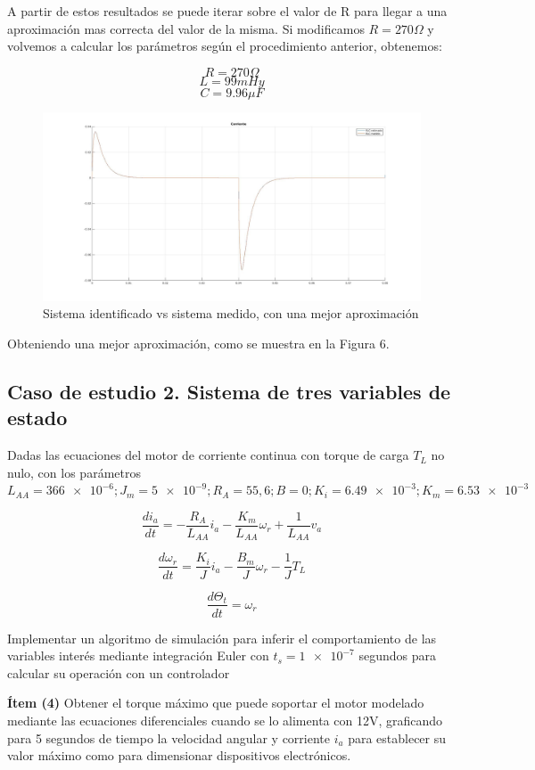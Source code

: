 \documentclass{article}
\begin{document}
  A partir de estos resultados se puede iterar sobre el valor de R para llegar a una aproximación mas
  correcta del valor de la misma. Si modificamos $R = 270\Omega$ y volvemos a calcular los parámetros según el procedimiento
  anterior, obtenemos:

  $$R=270\Omega$$
  $$L=99mHy $$
  $$C=9.96\mu F$$

  \begin{figure}[!h]
    \centering
    \includegraphics[width=1\textwidth]{img/rlc3-2.jpg}
    \caption{Sistema identificado vs sistema medido, con una mejor aproximación}
  \end{figure}

  Obteniendo una mejor aproximación, como se muestra en la Figura 6.

  \newpage
  \subsection{Caso de estudio 2. Sistema de tres variables de estado}
  \label{subsection:2}
  Dadas las ecuaciones del motor de corriente continua con torque de carga $T_L$ no nulo, con los parámetros $L_{AA}=\num{366e-6};J_{m}=\num{5e-9};R_A=55,6;B=0;K_i=\num{6.49e-3};K_m=\num{6.53e-3}$
  
  $$\frac{di_a}{dt} = -\frac{R_A}{L_{AA}}i_a - \frac{K_m}{L_{AA}}\omega_r +\frac{1}{L_{AA}}v_a$$

  $$\frac{d\omega_r}{dt} = \frac{K_i}{J}i_a - \frac{B_m}{J}\omega_r -\frac{1}{J}T_L$$

  $$\frac{d\Theta_t}{dt} = \omega_r$$
  
  Implementar un algoritmo de simulación para inferir el comportamiento de las variables interés
mediante integración Euler con $t_s=\num{1e-7}$ segundos para calcular su operación con un controlador

\textbf{Ítem (4)} Obtener el torque máximo que puede soportar el motor modelado mediante las ecuaciones
diferenciales cuando se lo alimenta con 12V, graficando para 5 segundos de tiempo la velocidad
angular y corriente $i_a$ para establecer su valor máximo como para dimensionar dispositivos
electrónicos.
\end{document}
